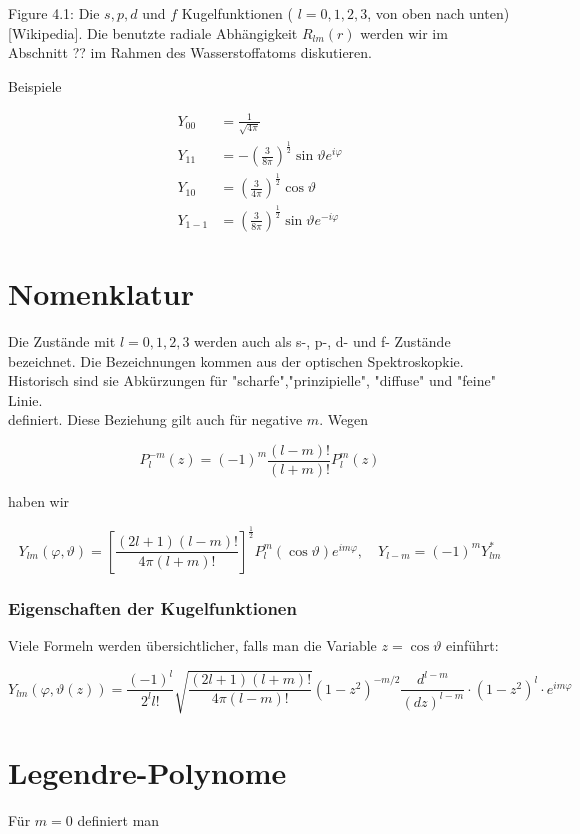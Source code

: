 \documentclass[10pt, letterpaper]{article}
\begin{document}
Figure 4.1: Die $s, p, d$ und $f$ Kugelfunktionen ( $l=0,1,2,3$, von oben nach unten) [Wikipedia]. Die benutzte radiale Abhängigkeit $R_{l m}(r)$ werden wir im Abschnitt ?? im Rahmen des Wasserstoffatoms diskutieren.

Beispiele

$$
\begin{aligned}
Y_{00} & =\frac{1}{\sqrt{4 \pi}} \\
Y_{11} & =-\left(\frac{3}{8 \pi}\right)^{\frac{1}{2}} \sin \vartheta e^{i \varphi} \\
Y_{10} & =\left(\frac{3}{4 \pi}\right)^{\frac{1}{2}} \cos \vartheta \\
Y_{1-1} & =\left(\frac{3}{8 \pi}\right)^{\frac{1}{2}} \sin \vartheta e^{-i \varphi}
\end{aligned}
$$

\section*{Nomenklatur}
Die Zustände mit $l=0,1,2,3$ werden auch als s-, p-, d- und f- Zustände bezeichnet. Die Bezeichnungen kommen aus der optischen Spektroskopkie. Historisch sind sie Abkürzungen für "scharfe","prinzipielle", "diffuse" und "feine" Linie.\\
definiert. Diese Beziehung gilt auch für negative $m$. Wegen

$$
P_{l}^{-m}(z)=(-1)^{m} \frac{(l-m)!}{(l+m)!} P_{l}^{m}(z)
$$

haben wir

$$
Y_{l m}(\varphi, \vartheta)=\left[\frac{(2 l+1)(l-m)!}{4 \pi(l+m)!}\right]^{\frac{1}{2}} P_{l}^{m}(\cos \vartheta) e^{i m \varphi}, \quad Y_{l-m}=(-1)^{m} Y_{l m}^{*}
$$

\subsubsection*{Eigenschaften der Kugelfunktionen}
Viele Formeln werden übersichtlicher, falls man die Variable $z=\cos \vartheta$ einführt:

$$
Y_{l m}(\varphi, \vartheta(z))=\frac{(-1)^{l}}{2^{l} l!} \sqrt{\frac{(2 l+1)(l+m)!}{4 \pi(l-m)!}}\left(1-z^{2}\right)^{-m / 2} \frac{d^{l-m}}{(d z)^{l-m}} \cdot\left(1-z^{2}\right)^{l} \cdot e^{i m \varphi}
$$

\section*{Legendre-Polynome}
Für $m=0$ definiert man
\end{document}
